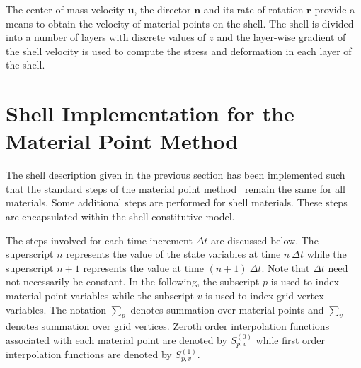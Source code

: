   The center-of-mass velocity $\mathbf{u}$, the director $\mathbf{n}$ and
  its rate of rotation $\mathbf{r}$ provide a means to obtain the velocity
  of material points on the shell.  The shell is divided into a number
  of layers with discrete values of $z$ and the layer-wise gradient of the 
  shell velocity is used to compute the stress and deformation in each layer 
  of the shell.

  \section{Shell Implementation for the Material Point Method}
  The shell description given in the previous section has been implemented
  such that the standard steps of the material point method~\cite{Sulsky1994}
  remain the same for all materials.  Some additional steps are performed for 
  shell materials.  These steps are encapsulated within the shell
  constitutive model.  

  The steps involved for each time increment $\Delta t$ are discussed below.
  The superscript $n$ represents the value of the state variables at time
  $n~\Delta t$ while the superscript $n+1$ represents the value at time
  $(n+1)~\Delta t$.  Note that $\Delta t$ need not necessarily be constant.
  In the following, the subscript $p$ is used to index material point variables
  while the subscript $v$ is used to index grid vertex variables.  The notation
  $\sum_p$ denotes summation over material points and $\sum_v$ denotes
  summation over grid vertices.  Zeroth order interpolation functions 
  associated with each material point are denoted by $S^{(0)}_{p,v}$ while
  first order interpolation functions are denoted by $S^{(1)}_{p,v}$.
